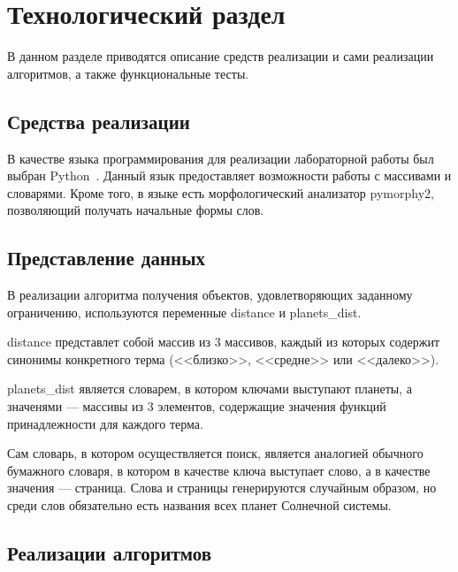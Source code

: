 \section{Технологический раздел \hfill}
\vspace{\baselineskip}

В данном разделе приводятся описание средств реализации и сами реализации алгоритмов, а также функциональные тесты.

\vspace{\baselineskip}
\subsection{Средства реализации}
\vspace{\baselineskip}

В качестве языка программирования для реализации лабораторной работы был выбран Python~\cite{PythonBook}. 
Данный язык предоставляет возможности работы с массивами и словарями.
Кроме того, в языке есть морфологический анализатор pymorphy2, позволяющий получать начальные формы слов.

\vspace{\baselineskip}
\subsection{Представление данных}
\vspace{\baselineskip}

В реализации алгоритма получения объектов, удовлетворяющих заданному ограничению, используются переменные distance и planets\_dist.

distance представлет собой массив из 3 массивов, каждый из которых содержит синонимы конкретного терма (<<близко>>, <<средне>> или <<далеко>>).

planets\_dist является словарем, в котором ключами выступают планеты, а значенями --- массивы из 3 элементов, содержащие значения функций принадлежности для каждого терма.

Сам словарь, в котором осуществляется поиск, является аналогией обычного бумажного словаря, в котором в качестве ключа выступает слово, а в качестве значения --- страница. Слова и страницы генерируются случайным образом, но среди слов обязательно есть названия всех планет Солнечной системы. 

\vspace{\baselineskip}
\subsection{Реализации алгоритмов}
\vspace{\baselineskip}

